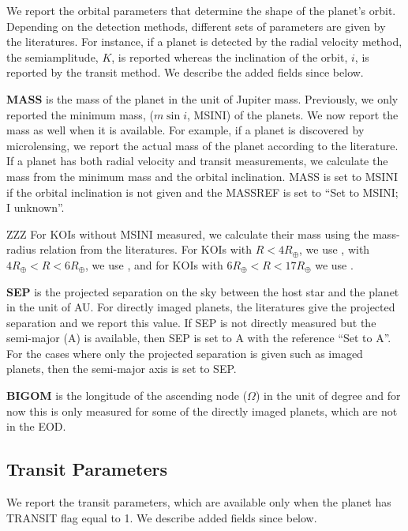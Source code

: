 \documentclass[11pt,preprint]{aastex}
\def\rearth{R_\oplus}
\begin{document}
\begin{CJK*}{UTF8}{gbsn}
We report the orbital parameters that determine the shape of the
planet's orbit. Depending on the detection methods, different sets of
parameters are given by the literatures. For instance, if a planet is
detected by the radial velocity method, the semiamplitude, $K$, is
reported whereas the inclination of the orbit, $i$, is reported by the
transit method. We describe the added fields since \cite{Wright2011}
below.  

{\bf MASS} is the mass of the planet in the unit of Jupiter
mass. Previously, we only reported the minimum mass, ($m\sin{i}$,
MSINI) of the planets. We now report the mass as well when it is
available. For example, if a planet is discovered by microlensing, we
report the actual mass of the planet according to the literature. If a
planet has both radial velocity and transit measurements, we calculate
the mass from the minimum mass and the orbital inclination. MASS is
set to MSINI if the orbital inclination is not given and the MASSREF
is set to ``Set to MSINI; I unknown''.  

ZZZ For KOIs without MSINI measured, we calculate their mass using the
mass-radius relation from the literatures. For KOIs with $R<4\rearth$,
we use \cite{Weiss2014} , with $4\rearth<R<6\rearth$, we use
\cite{Lissauer2011}, and for KOIs with $6\rearth<R<17\rearth$ we use
\cite{Mordasini2012}.  

{\bf SEP} is the projected separation on the sky between the host star
and the planet in the unit of AU. For directly imaged planets, the
literatures give the projected separation and we report this value.
If SEP is not directly measured but the semi-major (A) is available,
then SEP is set to A with the reference ``Set to A''. For the cases
where only the projected separation is given such as imaged planets,
then the semi-major axis is set to SEP.

{\bf BIGOM} is the longitude of the ascending node ($\Omega$) in the
unit of degree and for now this is only measured for some of the
directly imaged planets, which are not in the EOD.


\subsection{Transit Parameters}\label{sec:transit}

We report the transit parameters, which are available only when the
planet has TRANSIT flag equal to 1. We describe added fields since
\cite{Wright2011} below.


\end{CJK*}
\end{document}
